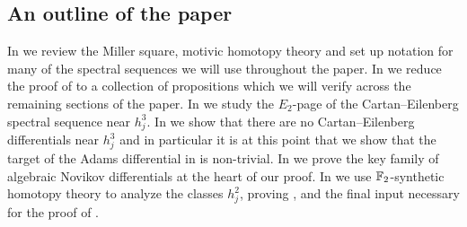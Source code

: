 \subsection{An outline of the paper}\hfill


In  we review the Miller square, motivic homotopy theory and set up notation for many of the spectral sequences we will use throughout the paper.
In  we reduce the proof of  to a collection of propositions which we will verify across the remaining sections of the paper.
In  we study the $E_2$-page of the Cartan--Eilenberg spectral sequence near $h_j^3$.
In  we show that there are no Cartan--Eilenberg differentials near $h_j^3$ and in particular it is at this point that we show that the target of the Adams differential in  is non-trivial.
In  we prove the key family of algebraic Novikov differentials at the heart of our proof.
In  we use $\operatorname{\mathbb{F}}_2$-synthetic homotopy theory to analyze the classes $h_j^2$, proving ,  and the final input necessary for the proof of .



